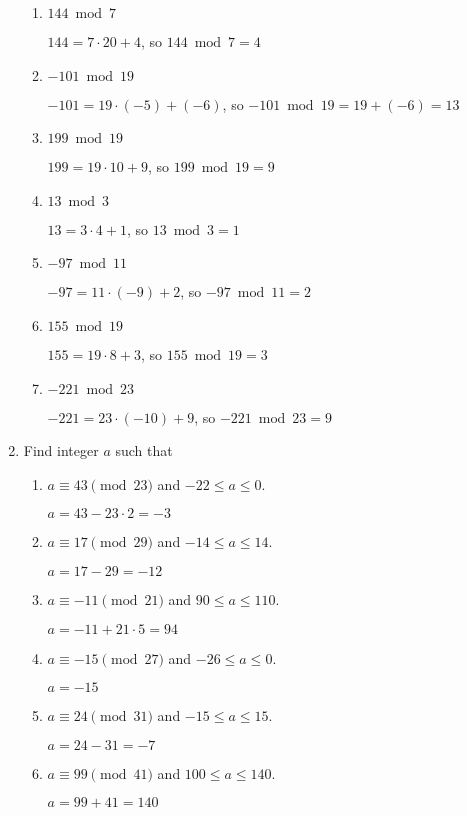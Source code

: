 \documentclass[11pt]{article}
\begin{document}
\begin{enumerate}[label=\textbf{\arabic*.}]
\begin{enumerate}[label=\textbf{\alph*)}]
		\item $144 \bmod 7$
		
		$144 = 7 \cdot 20 + 4$, so $144 \bmod 7 = 4$
		
		\item $-101 \bmod 19$
		
		$-101 = 19 \cdot (-5) + (-6)$, so $-101 \bmod 19 = 19 + (-6) = 13$
		
		\item $199 \bmod 19$
		
		$199 = 19 \cdot 10 + 9$, so $199 \bmod 19 = 9$
		
		\item $13 \bmod 3$
		
		$13 = 3 \cdot 4 + 1$, so $13 \bmod 3 = 1$
		
		\item $-97 \bmod 11$
		
		$-97 = 11 \cdot (-9) + 2$, so $-97 \bmod 11 = 2$
		
		\item $155 \bmod 19$
		
		$155 = 19 \cdot 8 + 3$, so $155 \bmod 19 = 3$
		
		\item $-221 \bmod 23$
		
		$-221 = 23 \cdot (-10) + 9$, so $-221 \bmod 23 = 9$
	\end{enumerate}

	\item Find integer $a$ such that
	
	\begin{enumerate}[label=\textbf{\alph*)}]
		\item $a \equiv 43 \pmod{23}$ and $-22 \leq a \leq 0$.
		
		$a = 43 - 23 \cdot 2 = -3$
		
		\item $a \equiv 17 \pmod{29}$ and $-14 \leq a \leq 14$.
		
		$a = 17 - 29 = -12$
		
		\item $a \equiv -11 \pmod{21}$ and $90 \leq a \leq 110$.
		
		$a = -11 + 21 \cdot 5 = 94$
		
		\item $a \equiv -15 \pmod{27}$ and $-26 \leq a \leq 0$.
		
		$a = -15$
		
		\item $a \equiv 24 \pmod{31}$ and $-15 \leq a \leq 15$.
		
		$a = 24 - 31 = -7$
		
		\item $a \equiv 99 \pmod{41}$ and $100 \leq a \leq 140$.
		
		$a = 99 + 41 = 140$
	\end{enumerate}
\end{enumerate}
\end{document}
